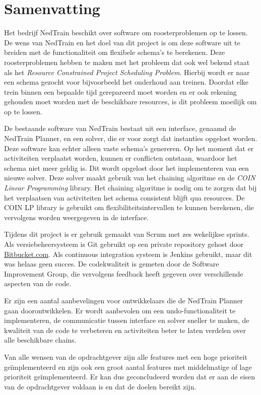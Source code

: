 \section*{Samenvatting}
Het bedrijf NedTrain beschikt over software om roosterproblemen op te lossen. De wens van NedTrain en het doel van dit project is om deze software uit te breiden met de functionaliteit om flexibele schema's te berekenen. Deze roosterproblemen hebben te maken met het probleem dat ook wel bekend staat als het \emph{Resource Constrained Project Scheduling Problem}. Hierbij wordt er naar een schema gezocht voor bijvoorbeeld het onderhoud aan treinen. Doordat elke trein binnen een bepaalde tijd gerepareerd moet worden en er ook rekening gehouden moet worden met de beschikbare resources, is dit probleem moeilijk om op te lossen.

De bestaande software van NedTrain bestaat uit een interface, genaamd de NedTrain Planner, en een solver, die er voor zorgt dat instanties opgelost worden. Deze software kan echter alleen vaste schema's genereren. Op het moment dat er activiteiten verplaatst worden, kunnen er conflicten ontstaan, waardoor het schema niet meer geldig is. Dit wordt opgelost door het implementeren van een nieuwe solver. Deze solver maakt gebruik van het chaining algoritme en de \emph{COIN Linear Programming} library. Het chaining algoritme is nodig om te zorgen dat bij het verplaatsen van activiteiten het schema consistent blijft qua resources. De COIN LP library is gebruikt om flexibiliteitsintervallen te kunnen berekenen, die vervolgens worden weergegeven in de interface. 

Tijdens dit project is er gebruik gemaakt van Scrum met zes wekelijkse sprints. Als versiebeheersysteem is Git gebruikt op een private repository gehost door \href{http://bitbucket.com}{Bitbucket.com}. Als continuous integration systeem is Jenkins gebruikt, maar dit was helaas geen succes. De codekwaliteit is gemeten door de Software Improvement Group, die vervolgens feedback heeft gegeven over verschillende aspecten van de code. 

Er zijn een aantal aanbevelingen voor ontwikkelaars die de NedTrain Planner gaan doorontwikkelen. Er wordt aanbevolen om een undo-functionaliteit te implementeren, de communicatie tussen interface en solver sneller te maken, de kwaliteit van de code te verbeteren en activiteiten beter te laten verdelen over alle beschikbare chains.

Van alle wensen van de opdrachtgever zijn alle features met een hoge prioriteit ge\"implementeerd en zijn ook een groot aantal features met middelmatige of lage prioriteit ge\"implementeerd. Er kan dus geconcludeerd worden dat er aan de eisen van de opdrachtgever voldaan is en dat de doelen bereikt zijn.
